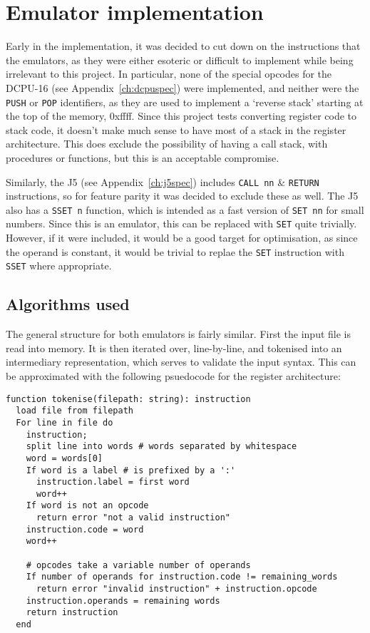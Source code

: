 \section{Emulator implementation}
Early in the implementation, it was decided to cut down on the instructions that
the emulators, as they were either esoteric or difficult to implement while
being irrelevant to this project. In particular, none of the special opcodes for
the DCPU-16 (see Appendix~\ref{ch:dcpuspec}) were implemented, and neither were
the \lstinline{PUSH} or \lstinline{POP} identifiers, as they are used to
implement a `reverse stack' starting at the top of the memory, 0xffff. Since
this project tests converting register code to stack code, it doesn't make much
sense to have most of a stack in the register architecture. This does exclude
the possibility of having a call stack, with procedures or functions, but this
is an acceptable compromise.

Similarly, the J5 (see Appendix~\ref{ch:j5spec}) includes \lstinline{CALL nn} \&
\lstinline{RETURN} instructions, so for feature parity it was decided to exclude
these as well. The J5 also has a \lstinline{SSET n} function, which is intended
as a fast version of \lstinline{SET nn} for small numbers. Since this is an
emulator, this can be replaced with \lstinline{SET} quite trivially. However, if
it were included, it would be a good target for optimisation, as since the
operand is constant, it would be trivial to replae the \lstinline{SET}
instruction with \lstinline{SSET} where appropriate.

\subsection{Algorithms used}
The general structure for both emulators is fairly similar. First the input
file is read into memory. It is then iterated over, line-by-line, and tokenised
into an intermediary representation, which serves to validate the input syntax.
This can be approximated with the following psuedocode for the register
architecture:

\begin{lstlisting}[caption={Tokenising algorithm for the DCPU-16}]
function tokenise(filepath: string): instruction
  load file from filepath
  For line in file do
    instruction;
    split line into words # words separated by whitespace
    word = words[0]
    If word is a label # is prefixed by a ':'
      instruction.label = first word
      word++
    If word is not an opcode
      return error "not a valid instruction"
    instruction.code = word
    word++

    # opcodes take a variable number of operands
    If number of operands for instruction.code != remaining_words
      return error "invalid instruction" + instruction.opcode
    instruction.operands = remaining words
    return instruction
  end
\end{lstlisting}


